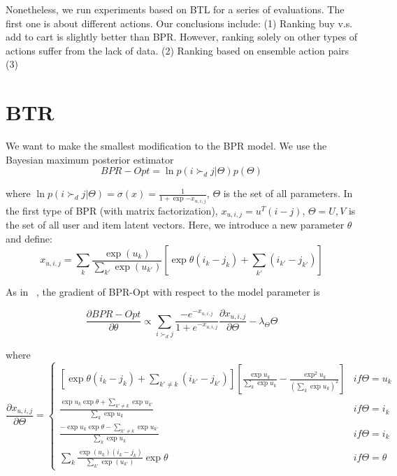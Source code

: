 \documentclass[11pt]{report}
\begin{document}
Nonetheless, we run experiments based on BTL for a series of evaluations. The first one is about different actions. Our conclusions include: (1) Ranking buy v.s. add to cart is slightly better than BPR. However,  ranking solely on other types of actions suffer from the lack of data. (2) Ranking based on ensemble action pairs (3) 

\section{BTR}
We want to make the smallest modification to the BPR model. We use the Bayesian maximum posterior estimator 
\begin{equation}
BPR-Opt = \ln p(i\succ_d j|\Theta) p(\Theta)
\end{equation}

where $\ln p(i\succ_d j|\Theta) =\sigma(x)=\frac{1}{1+\exp{-x_{u,i,j}}}$, $\Theta$ is the set of all parameters. In the first type of BPR (with matrix factorization), $x_{u,i,j}=u^T(i-j)$, $\Theta=U,V$ is the set of all user and item latent vectors. Here, we introduce a new parameter $\theta$ and define:
\begin{equation}
x_{u,i,j}=\sum_k \frac{\exp (u_k)}{\sum_{k'} \exp (u_{k'})}[\exp \theta(i_k-j_k)+\sum_{k'}(i_{k'}-j_{k'})]
\end{equation}


As in ~\cite{Rendle2009BPR},  the gradient of BPR-Opt with respect to the model parameter is

\begin{equation}
\frac{\partial BPR-Opt}{\partial \theta}\propto \sum_{i\succ_d j} \frac{-e^{-x_{u,i,j}}}{1+ e^{-x_{u,i,j}} } \frac{\partial x_{u,i,j}}{\partial \Theta} -\lambda_\Theta \Theta
\end{equation}

where 
\begin{equation}\label{equ:derivative}
 \frac{\partial x_{u,i,j}}{\partial \Theta}=\left\{\begin{matrix}
[\exp\theta (i_k-j_k)+\sum_{k'\neq k}(i_{k'}-j_{k'})][\frac{\exp u_k}{\sum_{k}\exp u_k}-\frac{\exp^2 u_k}{(\sum_k \exp u_k)^2}] & if \Theta=u_k \\ 
\frac{\exp u_k \exp \theta +\sum_{k'\neq k} \exp u_{k'}}{\sum_k \exp u_k}  & if \Theta= i_k \\ 
\frac{-\exp u_k \exp \theta -\sum_{k'\neq k} \exp u_{k'}}{\sum_k \exp u_k}  & if \Theta= i_k \\ 
\sum_k  \frac{\exp (u_k)(i_k-j_k )}{\sum_{k'} \exp (u_{k'})} \exp \theta & if \Theta = \theta 
\end{matrix}\right.
\end{equation}
\end{document}
